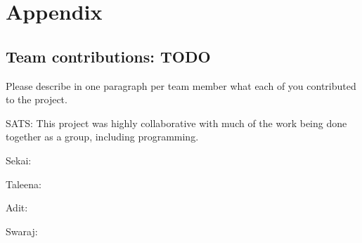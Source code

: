 \section*{Appendix}

\subsection*{Team contributions: TODO}

Please describe in one paragraph per team member what each of you contributed to the project.
\begin{description}
\item SATS: This project was highly collaborative with much of the work being done together as a group, including programming.

\item Sekai: 
\item Taleena: 
\item Adit: 
\item Swaraj: 
\end{description}

